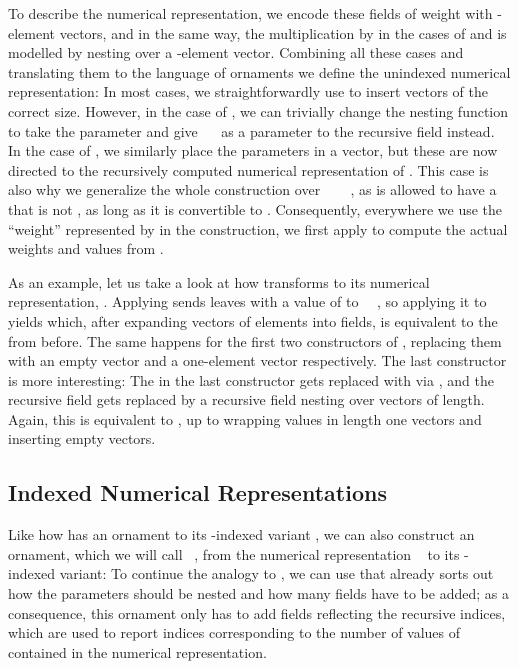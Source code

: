 To describe the numerical representation, we encode these fields of weight  with -element vectors, and in the same way, the multiplication by  in the cases of  and  is modelled by nesting over a -element vector. Combining all these cases and translating them to the language of ornaments we define the unindexed numerical representation:
In most cases, we straightforwardly use  to insert vectors of the correct size. However, in the case of , we can trivially change the nesting function to take the parameter  and give \ \  as a parameter to the recursive field instead. In the case of , we similarly place the parameters in a vector, but these are now directed to the recursively computed numerical representation of . This case is also why we generalize the whole construction over \ \AV{:} \ \ , as  is allowed to have a  that is not , as long as it is convertible to . Consequently, everywhere we use the ``weight'' represented by  in the construction, we first apply  to compute the actual weights and values from .

As an example, let us take a look at how  transforms  to its numerical representation, . Applying  sends leaves with a value of  to \ \ , so applying it to  yields
which, after expanding vectors of  elements into  fields, is equivalent to the  from before. The same happens for the first two constructors of , replacing them with an empty vector and a one-element vector respectively. The last constructor is more interesting:
The  in the last constructor gets replaced with  via , and the recursive field gets replaced by a recursive field nesting over vectors of length. Again, this is equivalent to , up to wrapping values in length one vectors and inserting empty vectors.


\subsection{Indexed Numerical Representations}\label{sec:itrieo}
Like how  has an ornament  to its \bN{}-indexed variant , we can also construct an ornament, which we will call \ , from the numerical representation \  to its -indexed variant:
To continue the analogy to , we can use that  already sorts out how the parameters should be nested and how many fields have to be added; as a consequence, this ornament only has to add fields reflecting the recursive indices, which are used to report indices corresponding to the number of values of  contained in the numerical representation.

